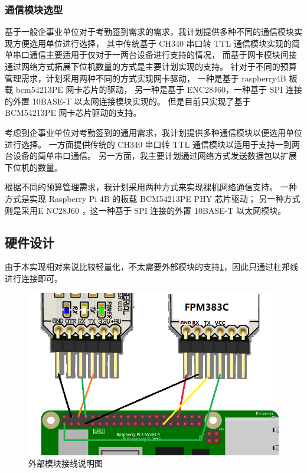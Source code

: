 \subsubsection{通信模块选型}

    基于一般企事业单位对于考勤签到需求的需求，我计划提供多种不同的通信模块实现方便选用单位进行选择，
    其中传统基于 CH340 串口转 TTL 通信模块实现的简单串口通信主要适用于仅对于一两台设备进行支持的情况，
    而基于网卡模块间接通过网络方式拓展下位机数量的方式是主要计划实现的支持。
    针对于不同的预算管理需求，计划采用两种不同的方式实现网卡驱动，
    一种是基于 raspberry4B 板载 bcm54213PE 网卡芯片的驱动，
    另一种是基于 ENC28J60，一种基于 SPI 连接的外置 10BASE-T 以太网连接模块实现的。
    但是目前只实现了基于 BCM54213PE 网卡芯片驱动的支持。

    考虑到企事业单位对考勤签到的通用需求，我计划提供多种通信模块以便选用单位进行选择。
    一方面提供传统的 CH340 串口转 TTL 通信模块以适用于支持一到两台设备的简单串口通信。
    另一方面，我主要计划通过网络方式发送数据包以扩展下位机的数量。

    根据不同的预算管理需求，我计划采用两种方式来实现裸机网络通信支持。
    一种方式是实现 Raspberry Pi 4B 的板载 BCM54213PE PHY 芯片驱动；
    另一种方式则是采用E NC28J60 ，这一种基于 SPI 连接的外置 10BASE-T 以太网模块。

\subsection{硬件设计}

    由于本实现相对来说比较轻量化，不太需要外部模块的支持\ref{外部模块接线图}，因此只通过杜邦线进行连接即可。

    \begin{figure}[ht]
    \centering
    \includegraphics[scale=0.6]{imgs/接线图.png}
    \caption{外部模块接线说明图}    \label{外部模块接线图}
    \end{figure}

